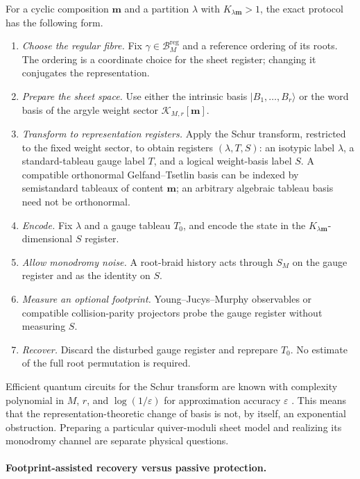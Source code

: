 \documentclass[11pt]{article}
\theoremstyle{definition}
\theoremstyle{remark}
\newcommand{\cK}{\mathcal K}
\newcommand{\cB}{\mathcal B}
\newcommand{\reg}{\mathrm{reg}}
\newcommand{\ket}[1]{\lvert #1\rangle}
\begin{document}
For a cyclic composition $\boldsymbol m$ and a partition $\lambda$ with $K_{\lambda\boldsymbol m}>1$, the exact protocol has the following form.
\begin{enumerate}
\item \emph{Choose the regular fibre.}  Fix $\gamma\in\cB_M^{\reg}$ and a reference ordering of its roots.  The ordering is a coordinate choice for the sheet register; changing it conjugates the representation.
\item \emph{Prepare the sheet space.}  Use either the intrinsic basis $\ket{B_1,\ldots,B_r}$ or the word basis of the argyle weight sector $\cK_{M,r}[\boldsymbol m]$.
\item \emph{Transform to representation registers.}  Apply the Schur transform, restricted to the fixed weight sector, to obtain registers $(\lambda,T,S)$: an isotypic label $\lambda$, a standard-tableau gauge label $T$, and a logical weight-basis label $S$.  A compatible orthonormal Gelfand--Tsetlin basis can be indexed by semistandard tableaux of content $\boldsymbol m$; an arbitrary algebraic tableau basis need not be orthonormal.
\item \emph{Encode.}  Fix $\lambda$ and a gauge tableau $T_0$, and encode the state in the $K_{\lambda\boldsymbol m}$-dimensional $S$ register.
\item \emph{Allow monodromy noise.}  A root-braid history acts through $S_M$ on the gauge register and as the identity on $S$.
\item \emph{Measure an optional footprint.}  Young--Jucys--Murphy observables or compatible collision-parity projectors probe the gauge register without measuring $S$.
\item \emph{Recover.}  Discard the disturbed gauge register and reprepare $T_0$.  No estimate of the full root permutation is required.
\end{enumerate}

Efficient quantum circuits for the Schur transform are known with complexity polynomial in $M$, $r$, and $\log(1/\varepsilon)$ for approximation accuracy $\varepsilon$ \cite{BaconChuangHarrow2006}.  This means that the representation-theoretic change of basis is not, by itself, an exponential obstruction.  Preparing a particular quiver-moduli sheet model and realizing its monodromy channel are separate physical questions.

\paragraph{Footprint-assisted recovery versus passive protection.}
\end{document}
